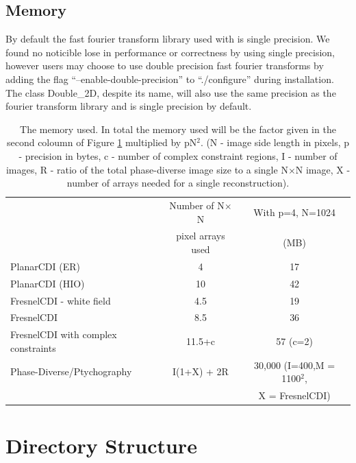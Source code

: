 \documentclass[]{cxs-software}
\begin{document}
\subsection{Memory}

By default the fast fourier transform library used with \name is
single precision. We found no noticible lose in performance or
correctness by using single precision, however users may choose to use
double precision fast fourier transforms by adding the flag
``--enable-double-precision'' to ``./configure'' during installation.
The class Double\_2D, despite its name, will also use the same
precision as the fourier transform library and is single precision by
default.

\begin{table}[h!]
\begin{tabular}[h!]{lcc}
\toprule
&  Number of N$\times$N & With p=4, N=1024 \\
&  pixel arrays used & (MB) \\
\midrule
PlanarCDI (ER) & 4 & 17 \\
PlanarCDI (HIO) & 10 & 42  \\
FresnelCDI - white field & 4.5 & 19 \\
FresnelCDI & 8.5 & 36 \\
FresnelCDI with complex constraints & 11.5+c & 57 (c=2) \\
Phase-Diverse/Ptychography & I(1+X) + 2R & 30,000 (I=400,M = 1100$^2$, \\
 &                 & X = FresnelCDI)  \\
\bottomrule
\end{tabular}

\caption{\label{table:memory}The memory used. 
In total the memory used will be the factor given in the second
coloumn of Figure \ref{table:memory} multiplied by pN$^2$.
(N - image side length in pixels, p - precision in bytes, 
c - number of complex constraint regions, I - number of images, 
R - ratio of the total phase-diverse image size to a single N$\times$N image,
X - number of arrays needed for a single reconstruction). 
}
\end{table}


\newpage

\section{Directory Structure}
\end{document}
